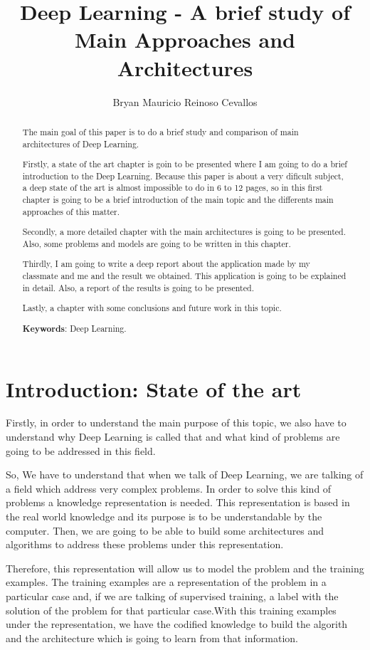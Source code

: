 \documentclass[12pt]{article}
\title{Deep Learning - A brief study of Main Approaches and Architectures}
\author{Bryan Mauricio Reinoso Cevallos}
\begin{document}
 

\maketitle
\begin{abstract} 
  The main goal of this paper is to do a brief study and comparison of main architectures of Deep Learning.
  
  Firstly, a state of the art chapter is goin to be presented where I am going to do a brief introduction to the Deep Learning. Because this paper is about a very dificult subject, a deep state of the art is almost impossible to do in 6 to 12 pages, so in this first chapter is going to be a brief introduction of the main topic and the differents main approaches of this matter.
  
  Secondly, a more detailed chapter with the main architectures is going to be presented. Also, some problems and models are going to be written in this chapter.
  
  Thirdly, I am going to write a deep report about the application made by my classmate and me and the result we obtained. This application is going to be explained in detail. Also, a report of the results is going to be presented.
  
  Lastly, a chapter with some conclusions and future work in this topic.
  
  \textbf{Keywords}: Deep Learning.
\end{abstract}

\section{Introduction: State of the art}

Firstly, in order to understand the main purpose of this topic, we also have to understand why Deep Learning is called that and what kind of problems are going to be addressed in this field.

So, We have to understand that when we talk of Deep Learning, we are talking of a field which address very complex problems. In order to solve this kind of problems a knowledge representation is needed. This representation is based in the real world knowledge and its purpose is to be understandable by the computer. Then, we are going to be able to build some architectures and algorithms to address these problems under this representation.

Therefore, this representation will allow us to model the problem and the training examples. The training examples are a representation of the problem in a particular case and, if we are talking of supervised training, a label with the solution of the problem for that particular case.With this training examples under the representation, we have the codified knowledge to build the algorith and the architecture which is going to learn from that information.
\end{document}
